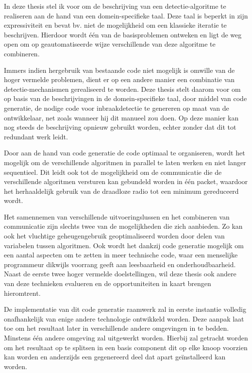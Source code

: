 \documentclass[12pt,a4paper,draft]{article}
\begin{document}
In deze thesis stel ik voor om de beschrijving van een detectie-algoritme te
realiseren aan de hand van een domein-specifieke taal. Deze taal is beperkt in
zijn expressiviteit en bevat bv. niet de mogelijkheid om een klassieke iteratie
te beschrijven. Hierdoor wordt \'e\'en van de basisproblemen ontweken en ligt
de weg open om op geautomatiseerde wijze verschillende van deze algoritme te
combineren.

Immers indien hergebruik van bestaande code niet mogelijk is omwille van de
hoger vermelde problemen, dient er op een andere manier een combinatie van
detectie-mechanismen gerealiseerd te worden. Deze thesis stelt daarom voor om
op basis van de beschrijvingen in de domein-specifieke taal, door middel van
code generatie, de nodige code voor inbraakdetectie te genereren op maat van de
ontwikkelaar, net zoals wanneer hij dit manueel zou doen. Op deze manier kan
nog steeds de beschrijving opnieuw gebruikt worden, echter zonder dat dit tot
redundant werk leidt.

Door aan de hand van code generatie de code optimaal te organiseren, wordt het
mogelijk om de verschillende algoritmen in parallel te laten werken en niet
langer sequentieel. Dit leidt ook tot de mogelijkheid om de communicatie die de
verschillende algoritmen versturen kan gebundeld worden in \'e\'en packet,
waardoor het herhaaldelijk gebruik van de draadloze radio tot een minimum
gereduceerd wordt.

Het samennemen van verschillende uitvoeringslussen en het combineren van
communicatie zijn slechts twee van de mogelijkheden die zich aanbieden. Zo kan
ook het vluchtige geheugengebruik geoptimaliseerd worden door delen van
variabelen tussen algoritmen. Ook wordt het dankzij code generatie mogelijk om
een aantal aspecten om te zetten in meer technische code, waar een menselijke
programmeur dikwijls voorrang geeft aan leesbaarheid en onderhoudbaarheid.
Naast de eerste twee hoger vermelde doelstellingen, wil deze thesis ook andere
van deze technieken evalueren en de opportuniteiten in kaart brengen
hieromtrent.

De implementatie van dit code generatie raamwerk zal in eerste instantie
volledig onafhankelijk van enige andere technologie ontwikkeld worden. Deze
aanpak laat toe om het resultaat later in verschillende andere omgevingen in te
bedden. Minstens \'e\'en andere omgeving zal uitgewerkt worden. Hierbij zal
getracht worden om het resultaat op te splitsen in een basis component dit op
elke knoop voorzien kan worden en anderzijds een gegenereerd deel dat apart
ge\"installeerd kan worden.
\end{document}
